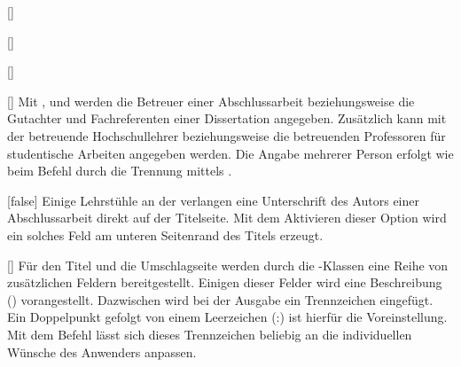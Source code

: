 \begin{Declaration*}{}
\begin{Declaration*}{}
\begin{Declaration*}{}
\begin{Declaration}{[]}
\begin{Declaration}{[]}
\begin{Declaration}{[]}
\begin{Declaration}{[]}
\printdeclarationlist%
%
%
%
%
Mit ,  und  werden die Betreuer 
einer Abschlussarbeit beziehungsweise die Gutachter und Fachreferenten einer 
Dissertation angegeben. Zusätzlich kann mit  der betreuende 
Hochschullehrer beziehungsweise die betreuenden Professoren für studentische 
Arbeiten angegeben werden. Die Angabe mehrerer Person erfolgt wie beim Befehl 
 durch die Trennung mittels .
\end{Declaration}
\end{Declaration}
\end{Declaration}
\end{Declaration}

\begin{Declaration}[v2.06]{}[false]%
\printdeclarationlist%
%
Einige Lehrstühle an der \TnUD verlangen eine Unterschrift des Autors einer 
Abschlussarbeit direkt auf der Titelseite. Mit dem Aktivieren dieser Option 
wird ein solches Feld am unteren Seitenrand des Titels erzeugt.
\end{Declaration}

\begin{Declaration}{[]}
\printdeclarationlist%
%
%
Für den Titel und die Umschlagseite werden durch die \TUDScript-Klassen eine 
Reihe von zusätzlichen Feldern bereitgestellt. Einigen dieser Felder wird eine 
Beschreibung () vorangestellt. Dazwischen 
wird bei der Ausgabe ein Trennzeichen eingefügt. Ein Doppelpunkt gefolgt von 
einem Leerzeichen (:) ist hierfür die Voreinstellung. Mit 
dem Befehl  lässt sich dieses Trennzeichen beliebig an 
die individuellen Wünsche des Anwenders anpassen.
%
\end{Declaration}



\end{Declaration*}
\end{Declaration*}
\end{Declaration*}
